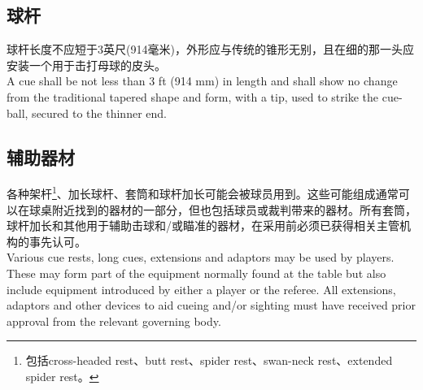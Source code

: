 \subsection{球杆}

\noindent 球杆长度不应短于3英尺(914毫米)，外形应与传统的锥形无别，且在细的那一头应安装一个用于击打母球的皮头。\\
A cue shall be not less than 3 ft (914 mm) in length and shall show no change from the traditional tapered shape and form, with a tip, used to strike the cue-ball, secured to the thinner end.

\subsection{辅助器材}

\noindent 各种架杆\footnote{包括cross-headed rest、butt rest、spider rest、swan-neck rest、extended spider rest。}、加长球杆、套筒和球杆加长可能会被球员用到。这些可能组成通常可以在球桌附近找到的器材的一部分，但也包括球员或裁判带来的器材。所有套筒，球杆加长和其他用于辅助击球和/或瞄准的器材，在采用前必须已获得相关主管机构的事先认可。\\
Various cue rests, long cues, extensions and adaptors may be used by players. These may form part of the equipment normally found at the table but also include equipment introduced by either a player or the referee. All extensions, adaptors and other devices to aid cueing and/or sighting must have received prior approval from the relevant governing body.
